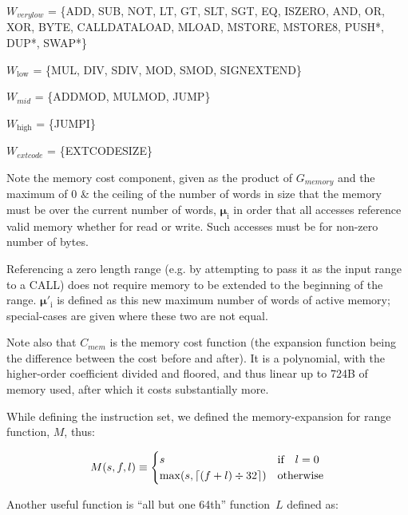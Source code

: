 \documentclass[9pt,oneside]{amsart}
\DeclarePairedDelimiter{\ceil}{\lceil}{\rceil}
\begin{document}
$W_{verylow}$ = \{{\small ADD}, {\small SUB}, {\small NOT}, {\small LT}, {\small GT}, {\small SLT}, {\small SGT}, {\small EQ}, {\small ISZERO}, {\small AND}, {\small OR}, {\small XOR}, {\small BYTE}, {\small CALLDATALOAD}, \newline \noindent\hspace*{1cm} {\small MLOAD}, {\small MSTORE}, {\small MSTORE8}, {\small PUSH*}, {\small DUP*}, {\small SWAP*}\}

$W_{\mathrm{low}}$ = \{{\small MUL}, {\small DIV}, {\small SDIV}, {\small MOD}, {\small SMOD}, {\small SIGNEXTEND}\}

$W_{mid}$ = \{{\small ADDMOD}, {\small MULMOD}, {\small JUMP}\}

$W_{\mathrm{high}}$ = \{{\small JUMPI}\}

$W_{extcode}$ = \{{\small EXTCODESIZE}\}

Note the memory cost component, given as the product of $G_{memory}$ and the maximum of 0 \& the ceiling of the number of words in size that the memory must be over the current number of words, $\boldsymbol{\mu}_{\mathrm{i}}$ in order that all accesses reference valid memory whether for read or write. Such accesses must be for non-zero number of bytes.

Referencing a zero length range (e.g. by attempting to pass it as the input range to a CALL) does not require memory to be extended to the beginning of the range. $\boldsymbol{\mu}'_{\mathrm{i}}$ is defined as this new maximum number of words of active memory; special-cases are given where these two are not equal.

Note also that $C_{mem}$ is the memory cost function (the expansion function being the difference between the cost before and after). It is a polynomial, with the higher-order coefficient divided and floored, and thus linear up to 724B of memory used, after which it costs substantially more.

While defining the instruction set, we defined the memory-expansion for range function, $M$, thus:

\begin{equation}
M(s, f, l) \equiv \begin{cases}
s & \text{if} \quad l = 0 \\
\max(s, \ceil{ (f + l) \div 32 }) & \text{otherwise}
\end{cases}
\end{equation}

Another useful function is ``all but one 64th'' function~$L$ defined as:
\end{document}
